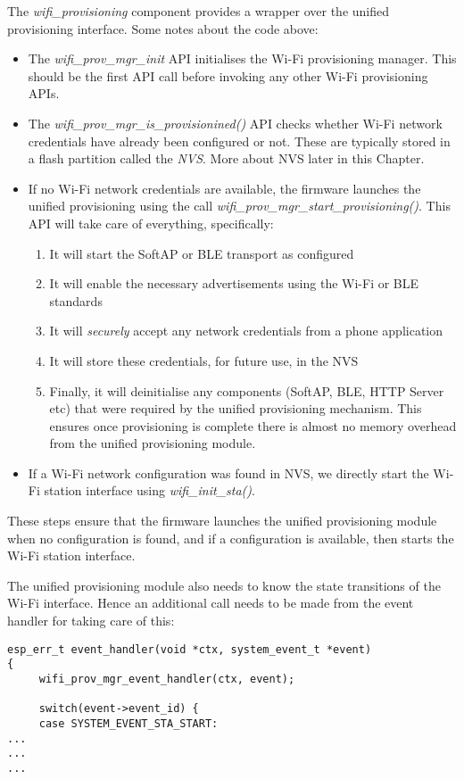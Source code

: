 \documentclass[main.tex]{subfiles}
\begin{document}
The \textit{wifi\_provisioning} component provides a wrapper over the unified provisioning interface. Some notes about the code above:
\begin{itemize}
    \item The \textit{wifi\_prov\_mgr\_init} API initialises the Wi-Fi provisioning manager. This should be the first API call before invoking any other Wi-Fi provisioning APIs.
    \item The \textit{wifi\_prov\_mgr\_is\_provisionined()} API checks whether Wi-Fi network credentials have already been configured or not. These are typically stored in a flash partition called the \textit{NVS}. More about NVS later in this Chapter.
    \item If no Wi-Fi network credentials are available, the firmware launches the unified provisioning using the call \textit{wifi\_prov\_mgr\_start\_provisioning()}. This API will take care of everything, specifically:
    \begin{enumerate}
        \item It will start the SoftAP or BLE transport as configured
        \item It will enable the necessary advertisements using the Wi-Fi or BLE standards
        \item It will \textit{securely} accept any network credentials from a phone application
        \item It will store these credentials, for future use, in the NVS
        \item Finally, it will deinitialise any components (SoftAP, BLE, HTTP Server etc) that were required by the unified provisioning mechanism. This ensures once provisioning is complete there is almost no memory overhead from the unified provisioning module.
    \end{enumerate}
    \item If a Wi-Fi network configuration was found in NVS, we directly start the Wi-Fi station interface using \textit{wifi\_init\_sta()}.
\end{itemize}

These steps ensure that the firmware launches the unified provisioning module when no configuration is found, and if a configuration is available, then starts the Wi-Fi station interface.

The unified provisioning module also needs to know the state transitions of the Wi-Fi interface. Hence an additional call needs to be made from the event handler for taking care of this:
\begin{verbatim}
esp_err_t event_handler(void *ctx, system_event_t *event)
{
     wifi_prov_mgr_event_handler(ctx, event);

     switch(event->event_id) {
     case SYSTEM_EVENT_STA_START:
...
...
...
\end{verbatim}
\end{document}
